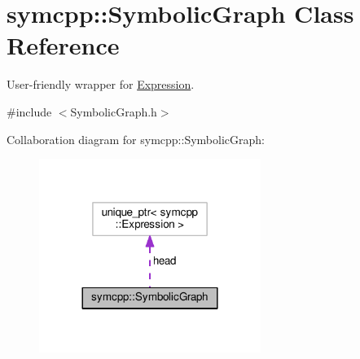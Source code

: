 \hypertarget{classsymcpp_1_1SymbolicGraph}{}\section{symcpp\+:\+:Symbolic\+Graph Class Reference}
\label{classsymcpp_1_1SymbolicGraph}


User-\/friendly wrapper for \hyperlink{classsymcpp_1_1Expression}{Expression}.  




{\ttfamily \#include $<$Symbolic\+Graph.\+h$>$}



Collaboration diagram for symcpp\+:\+:Symbolic\+Graph\+:\nopagebreak
\begin{figure}[H]
\begin{center}
\leavevmode
\includegraphics[width=204pt]{classsymcpp_1_1SymbolicGraph__coll__graph}
\end{center}
\end{figure}
